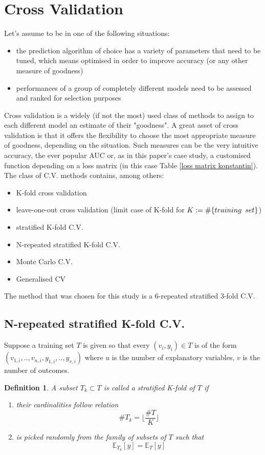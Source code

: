 \documentclass[a4paper,12pt]{article}
\newtheorem{definition}{Definition}[section]
\begin{document}
\section{Cross Validation}

Let's assume to be in one of the following situations: 
\begin{itemize}
\item the prediction algorithm of choice has a variety of parameters that need to be tuned, which means optimised in order to improve accuracy (or any other measure of goodness)
\item performances of a group of completely different models need to be assessed and ranked for selection purposes
\end{itemize}
Cross validation is a widely (if not the most) used class of methods to assign to each different model an estimate of their "goodness". A great asset of cross validation is that it offers the flexibility to choose the most appropriate measure of goodness, depending on the situation. Such measures can be the very intuitive accuracy, the ever popular AUC or, as in this paper's case study, a customised function depending on a loss matrix (in this case Table \ref{loss matrix konstantin}).\\
The class of C.V. methods contains, among others:
\begin{itemize}
\item K-fold cross validation
\item leave-one-out cross validation (limit case of K-fold for $K:= \# \{ training \enskip set\}$)
\item stratified K-fold C.V.
\item N-repeated stratified K-fold C.V.
\item Monte Carlo C.V.
\item Generalised CV
\end{itemize}
The method that was chosen for this study is a 6-repeated  stratified 3-fold C.V.

\subsection{N-repeated stratified K-fold C.V.}

Suppose a training set $T$ is given so that every $(v_{i}, y_{i}) \in T$ is of the form $(v_{1,i}, .., v_{u,i}, y_{1,i}, .., y_{v,i})$ where $u$ is the number of explanatory variables, $v$ is the number of outcomes.

\begin{definition}
A subset $T_{k} \subset T$ is called a stratified K-fold of $T$ if 
\begin{enumerate}
\item their cardinalities follow relation $$ \# T_{k} = \Big\lfloor \frac{\#T}{K} \Big\rfloor $$
\item is picked randomly from the family of subsets of $T$ such that $$ \mathbb{E}_{T_{k}} [y] = \mathbb{E}_{T} [y]$$
\end{enumerate}
\end{definition}
\end{document}
